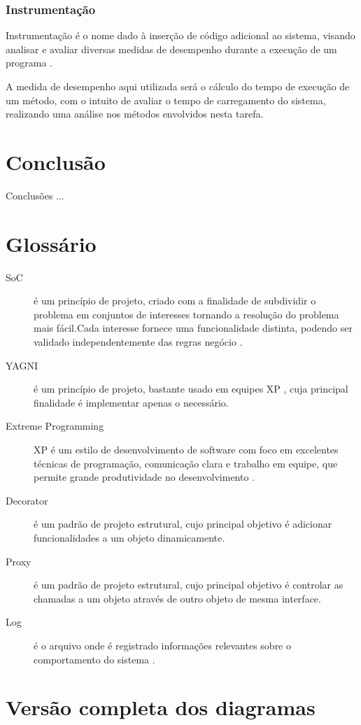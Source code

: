 \documentclass[tc,oneside]{iiufrgs}
\begin{document}
\subsection{Instrumentação}

Instrumentação é o nome dado à inserção de código adicional ao sistema, visando analisar e avaliar diversas medidas de desempenho durante a execução de um programa \cite{cabral2005instrumentaccao} . 

A medida de desempenho aqui utilizada será o cálculo do tempo de execução de um método, com o intuito de avaliar o tempo de carregamento do sistema, realizando uma análise nos métodos envolvidos nesta tarefa.


\chapter{Conclusão}

Conclusões ...

\singlespacing



\chapter*{Glossário}

\begin{description}
	\item[SoC] é um princípio de projeto, criado com a finalidade de subdividir o problema em conjuntos de interesses tornando a resolução do problema mais fácil.Cada interesse fornece uma funcionalidade distinta, podendo ser validado independentemente das regras negócio \cite{pressman2010engineering}.
	\item [YAGNI] é um princípio de projeto, bastante usado em equipes XP , cuja principal finalidade é implementar apenas o necessário.
	\item[Extreme Programming] XP é um estilo de desenvolvimento de software com foco em excelentes técnicas de programação, comunicação clara e trabalho em equipe, que permite grande produtividade no desenvolvimento \cite{beck2004extreme}.
\item [Decorator] é um padrão de projeto estrutural, cujo principal objetivo é adicionar funcionalidades a um objeto dinamicamente.
\item [Proxy] é um padrão de projeto estrutural, cujo principal objetivo é controlar as chamadas a um objeto através de outro objeto de mesma interface.
\item [Log] é o arquivo onde é registrado informações relevantes sobre o comportamento do sistema \cite{log}.
\end{description}

\appendix


\chapter{Versão completa dos diagramas}
\label{apend:A}
\end{document}
